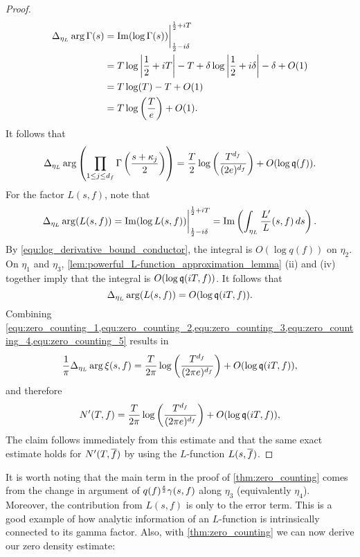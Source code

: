 \begin{proof}
      \begin{align*}
        \Delta_{\eta_{L}}\arg\Gamma(s) &= \mathrm{Im}(\log\Gamma(s))\bigg|_{\frac{1}{2}-i\delta}^{\frac{1}{2}+iT} \\
        &= T\log\left|\frac{1}{2}+iT\right|-T+\delta\log\left|\frac{1}{2}+i\delta\right|-\delta+O(1) \\
        &= T\log(T)-T+O(1) \\
        &= T\log\left(\frac{T}{e}\right)+O(1).
      \end{align*}
      It follows that
      \begin{equation}\label{equ:zero_counting_4}
        \Delta_{\eta_{L}}\arg\left(\prod_{1 \le j \le d_{f}}\Gamma\left(\frac{s+\kappa_{j}}{2}\right)\right) = \frac{T}{2}\log\left(\frac{T^{d_{f}}}{(2e)^{d_{f}}}\right)+O(\log{\mathfrak{q}(f)}).
      \end{equation}
      For the factor $L(s,f)$, note that
      \[
        \Delta_{\eta_{L}}\arg(L(s,f)) = \mathrm{Im}(\log{L(s,f)})\bigg|_{\frac{1}{2}-i\delta}^{\frac{1}{2}+iT} = \mathrm{Im}\left(\int_{\eta_{L}}\frac{L'}{L}(s,f)\,ds\right).
      \]
      By \cref{equ:log_derivative_bound_conductor}, the integral is $O(\log{q(f)})$ on $\eta_{2}$. On $\eta_{1}$ and $\eta_{3}$, \cref{lem:powerful_L-function_approximation_lemma} (ii) and (iv) together imply that the integral is $O(\log{\mathfrak{q}(iT,f)})$. It follows that
      \begin{equation}\label{equ:zero_counting_5}
        \Delta_{\eta_{L}}\arg(L(s,f)) = O(\log{\mathfrak{q}(iT,f)}).
      \end{equation}
      Combining \cref{equ:zero_counting_1,equ:zero_counting_2,equ:zero_counting_3,equ:zero_counting_4,equ:zero_counting_5} results in
      \[
        \frac{1}{\pi}\Delta_{\eta_{L}}\arg\xi(s,f) = \frac{T}{2\pi}\log\left(\frac{T^{d_{f}}}{(2\pi e)^{d_{f}}}\right)+O(\log{\mathfrak{q}(iT,f)}),
      \]
      and therefore
      \[
        N'(T,f) = \frac{T}{2\pi}\log\left(\frac{T^{d_{f}}}{(2\pi e)^{d_{f}}}\right)+O(\log{\mathfrak{q}(iT,f)}),
      \]
      The claim follows immediately from this estimate and that the same exact estimate holds for $N'(T,\overline{f})$ by using the $L$-function $L(s,\overline{f})$.
    \end{proof}

    It is worth noting that the main term in the proof of \cref{thm:zero_counting} comes from the change in argument of $q(f)^{\frac{s}{2}}\gamma(s,f)$ along $\eta_{3}$ (equivalently $\eta_{4}$). Moreover, the contribution from $L(s,f)$ is only to the error term. This is a good example of how analytic information of an $L$-function is intrinsically connected to its gamma factor. Also, with \cref{thm:zero_counting} we can now derive our zero density estimate:

